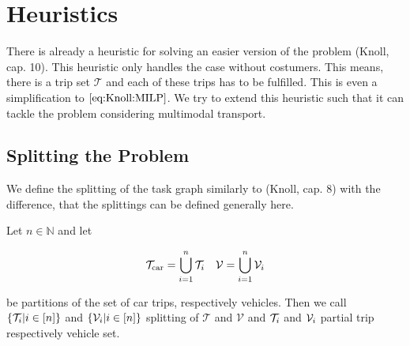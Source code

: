 \section{Heuristics}

There is already a heuristic for solving an easier version of the problem (Knoll, cap. 10). This heuristic only handles the case without costumers. This means, there is a trip set $\mathcal{T}$ and each of these trips has to be fulfilled. This is even a simplification to $\eqref{eq:Knoll:MILP}$. We try to extend this heuristic such that it can tackle the problem considering multimodal transport. 

\subsection{Splitting the Problem}

We define the splitting of the task graph similarly to (Knoll, cap. 8) with the difference, that the splittings can be defined generally here.

\begin{definition}[Splitting]
\label{def:splitting}

Let $n\in\mathbb{N}$ and let

\begin{align*}
	\mathcal{T}_{\operatorname{car}}=\bigcup_{i=1}^n\mathcal{T}_i && \mathcal{V}=\bigcup_{i=1}^n\mathcal{V}_i
\end{align*}

be partitions of the set of car trips, respectively vehicles. Then we call $\left\{\mathcal{T}_i|i\in[n]\right\}$ and $\left\{\mathcal{V}_i|i\in[n]\right\}$ splitting of $\mathcal{T}$ and $\mathcal{V}$ and $\mathcal{T}_i$ and $\mathcal{V}_i$ partial trip respectively vehicle set.

\end{definition}

